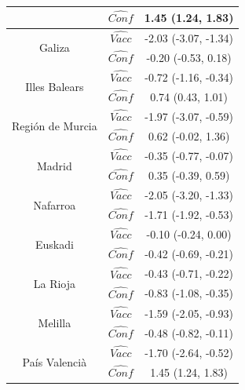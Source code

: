 \documentclass{article}
\begin{document}
\begin{table}[h]
\begin{tabular}{ccc}
                                & $\hat{Conf}$  & 1.45 (1.24, 1.83) \\
\midrule
\multirow{2}{*}{Galiza}     & $\hat{Vacc}$  & -2.03 (-3.07, -1.34) \\
                            & $\hat{Conf}$  & -0.20 (-0.53, 0.18) \\
\midrule
\multirow{2}{*}{Illes Balears}    & $\hat{Vacc}$  & -0.72 (-1.16, -0.34) \\
                                  & $\hat{Conf}$  & 0.74 (0.43, 1.01) \\
\midrule
\multirow{2}{*}{Regi\'on de Murcia}    & $\hat{Vacc}$  & -1.97 (-3.07, -0.59) \\
                                       & $\hat{Conf}$  & 0.62 (-0.02, 1.36) \\
\midrule
\multirow{2}{*}{Madrid}      & $\hat{Vacc}$  & -0.35 (-0.77, -0.07) \\
                             & $\hat{Conf}$  & 0.35 (-0.39, 0.59) \\
\midrule
\multirow{2}{*}{Nafarroa}   & $\hat{Vacc}$  & -2.05 (-3.20, -1.33) \\
                            & $\hat{Conf}$  & -1.71 (-1.92, -0.53) \\
\midrule
\multirow{2}{*}{Euskadi}    & $\hat{Vacc}$  & -0.10 (-0.24, 0.00) \\
                            & $\hat{Conf}$  & -0.42 (-0.69, -0.21) \\
\midrule
\multirow{2}{*}{La Rioja}    & $\hat{Vacc}$  & -0.43 (-0.71, -0.22) \\
                             & $\hat{Conf}$  & -0.83 (-1.08, -0.35) \\
\midrule
\multirow{2}{*}{Melilla}   & $\hat{Vacc}$  & -1.59 (-2.05, -0.93) \\
                           & $\hat{Conf}$  & -0.48 (-0.82, -0.11) \\
\midrule
\multirow{2}{*}{Pa\'is Valenci\`a}    & $\hat{Vacc}$  & -1.70 (-2.64, -0.52) \\
                                      & $\hat{Conf}$  & 1.45 (1.24, 1.83) \\
\bottomrule
\end{tabular}
\end{table}
\end{document}

